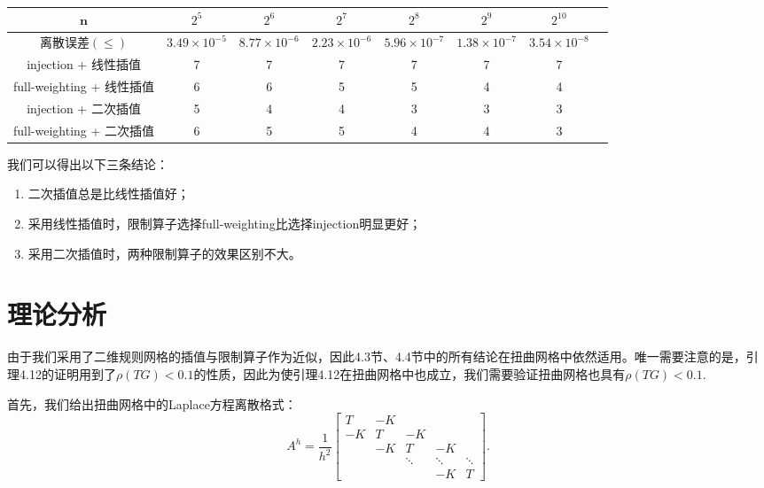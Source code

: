 \documentclass[lang=cn,10pt]{elegantbook}
\begin{document}
\begin{table}[H]
  \centering
  \small
  \begin{tabular}{c|ccccccc}
   $\mathbf{n}$      & $2^{5}$                   & $2^{6}$                   & $2^{7}$                  & $2^{8}$      & $2^{9}$   & $2^{10}$           \\ \hline
离散误差$(\leq)$   & $3.49\times 10^{-5}$ & $8.77\times 10^{-6}$ & $2.23\times 10^{-6}$ & $5.96\times 10^{-7}$ & $1.38\times 10^{-7}$ & $3.54\times 10^{-8}$ \\
injection + 线性插值        & 7  & 7 & 7 & 7 & 7 & 7 \\
full-weighting + 线性插值   & 6  & 6 & 5 & 5 & 4 & 4 \\
injection + 二次插值        & 5  & 4 & 4 & 3 & 3 & 3 \\
full-weighting + 二次插值   & 6  & 5 & 5 & 4 & 4 & 3 \\
\end{tabular}
\end{table}

我们可以得出以下三条结论：
\begin{enumerate}
  \item 二次插值总是比线性插值好；
  \item 采用线性插值时，限制算子选择full-weighting比选择injection明显更好；
  \item 采用二次插值时，两种限制算子的效果区别不大。
\end{enumerate}

\section{理论分析}

由于我们采用了二维规则网格的插值与限制算子作为近似，因此4.3节、4.4节中的所有结论在扭曲网格中依然适用。唯一需要注意的是，引理4.12的证明用到了$\rho(TG)<0.1$的性质，因此为使引理4.12在扭曲网格中也成立，我们需要验证扭曲网格也具有$\rho(TG)<0.1$.

首先，我们给出扭曲网格中的Laplace方程离散格式：
\begin{equation}
  A^h=\frac{1}{h^2}\begin{bmatrix}
    T & -K & \\
    -K & T & -K & \\
    & -K & T & -K &\\
    & & \ddots & \ddots & \ddots\\
    & & & -K & T
  \end{bmatrix}.
\end{equation}
\end{document}
